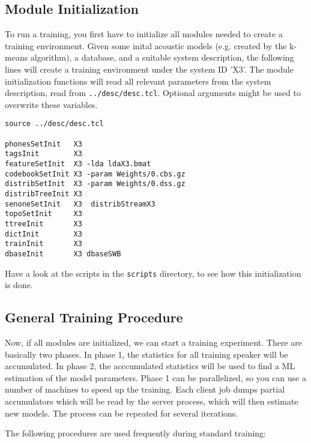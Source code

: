 \subsection{Module Initialization}

To run a training, you first have  to initialize all modules needed to
create a training environment.    Given  some inital acoustic   models
(e.g. created by  the k-means algorithm),  a database, and  a suitable
system description,    the  following lines    will create a  training
environment under  the  system ID   'X3'.  The  module  initialization
functions will read   all    relevant  parameters  from  the    system
description, read  from  \texttt{../desc/desc.tcl}. Optional arguments
might be used to overwrite these variables.

\begin{verbatim}
source ../desc/desc.tcl

phonesSetInit   X3
tagsInit        X3
featureSetInit  X3 -lda ldaX3.bmat
codebookSetInit X3 -param Weights/0.cbs.gz
distribSetInit  X3 -param Weights/0.dss.gz
distribTreeInit X3 
senoneSetInit   X3  distribStreamX3
topoSetInit     X3
ttreeInit       X3
dictInit        X3 
trainInit       X3
dbaseInit       X3 dbaseSWB
\end{verbatim}

Have a look at the scripts in the \texttt{scripts} directory, to see how
this initialization is done.

\subsection{General Training Procedure }

Now,  if  all   modules are  initialized,  we   can start   a training
experiment.    There    are basically  two phases.    In  phase 1, the
statistics for all  training speaker will be  accumulated. In phase 2,
the acccumulated  statistics will be used  to find  a ML estimation of
the model  parameters.  Phase 1 can be  parallelized, so you can use a
number of machines  to speed up the   training. Each client job  dumps
partial accumulators which will be  read by the server process,  which
will then estimate new models. The process can be repeated for several
iterations.

The following procedures are used frequently during standard training:


